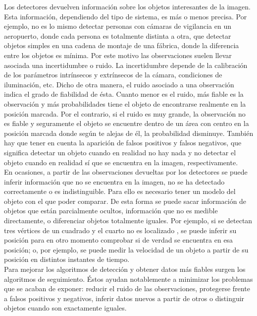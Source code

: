 Los detectores devuelven información sobre los objetos interesantes de la imagen. Esta información, dependiendo del tipo de sistema, es más o menos precisa. Por ejemplo, no es lo mismo detectar personas con cámaras de vigilancia en un aeropuerto, donde cada persona es totalmente distinta a otra, que detectar objetos simples en una cadena de montaje de una fábrica, donde la diferencia entre los objetos es mínima. Por este motivo las observaciones suelen llevar asociada una incertidumbre o ruido. La incertidumbre depende de la calibración de los parámetros intrínsecos y extrínsecos de la cámara, condiciones de iluminación, etc. Dicho de otra manera, el ruido asociado a una observación indica el grado de fiabilidad de ésta. Cuanto menor es el ruido, más fiable es la observación y más probabilidades tiene el objeto de encontrarse realmente en la posición marcada. Por el contrario, si el ruido es muy grande, la observación no es fiable y seguramente el objeto se encuentre dentro de un área con centro en la posición marcada donde según te alejas de él, la probabilidad disminuye. También hay que tener en cuenta la aparición de falsos positivos y falsos negativos, que significa detectar un objeto cuando en realidad no hay nada y no detectar el objeto cuando en realidad sí que se encuentra en la imagen, respectivamente. \\

En ocasiones, a partir de las observaciones devueltas por los detectores se puede inferir información que no se encuentra en la imagen, no se ha detectado correctamente o es indistinguible. Para ello es necesario tener un modelo del objeto con el que poder comparar. De esta forma se puede sacar información de objetos que están parcialmente ocultos, información que no es medible directamente, o diferenciar objetos totalmente iguales. Por ejemplo, si se detectan tres vértices de un cuadrado y el cuarto no es localizado \cite{rocapal}, se puede inferir su posición para en otro momento comprobar si de verdad se encuentra en esa posición; o, por ejemplo, se puede medir la velocidad de un objeto a partir de su posición en distintos instantes de tiempo. \\

Para mejorar los algoritmos de detección y obtener datos más fiables surgen los algoritmos de seguimiento. Éstos ayudan notablemente a minimizar los problemas que se acaban de exponer: reducir el ruido de las observaciones, protegerse frente a falsos positivos y negativos, inferir datos nuevos a partir de otros o distinguir objetos cuando son exactamente iguales. \\

